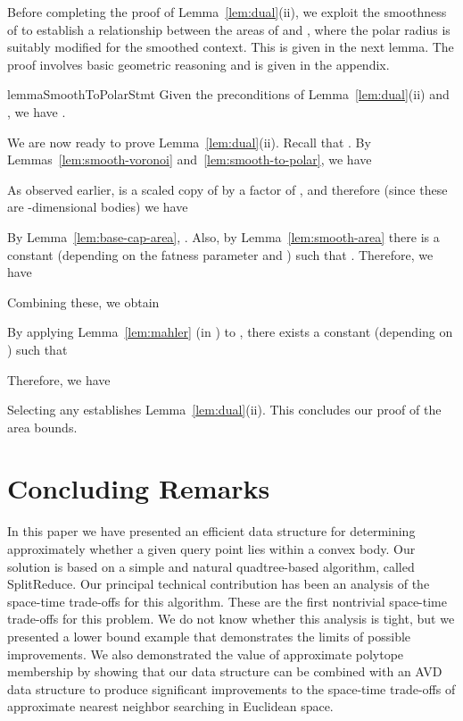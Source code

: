 \documentclass[11pt]{article}   \usepackage[letterpaper,hmargin=2.1cm,vmargin=3cm]{geometry}
\newcommand{\alg}{\textrm{SplitReduce}}
\begin{document}
Before completing the proof of Lemma~\ref{lem:dual}(ii), we exploit the smoothness of  to establish a relationship between the areas of  and , where the polar radius  is suitably modified for the smoothed context. This is given in the next lemma. The proof involves basic geometric reasoning and is given in the appendix.

\begin{restatable}{lemma}{SmoothToPolarStmt}\label{lem:smooth-to-polar}
Given the preconditions of Lemma~\ref{lem:dual}(ii) and , we have .
\end{restatable}


\bigskip

We are now ready to prove Lemma~\ref{lem:dual}(ii). Recall that . By Lemmas~\ref{lem:smooth-voronoi} and~\ref{lem:smooth-to-polar}, we have

As observed earlier,  is a scaled copy of  by a factor of , and therefore (since these are -dimensional bodies) we have

By Lemma~\ref{lem:base-cap-area}, . Also, by Lemma~\ref{lem:smooth-area} there is a constant  (depending on the fatness parameter  and ) such that . Therefore, we have

Combining these, we obtain

By applying Lemma~\ref{lem:mahler} (in ) to , there exists a constant  (depending on ) such that

Therefore, we have

Selecting any  establishes Lemma~\ref{lem:dual}(ii). This concludes our proof of the area bounds. 

\section{Concluding Remarks}


In this paper we have presented an efficient data structure for determining approximately whether a given query point lies within a convex body. Our solution is based on a simple and natural quadtree-based algorithm, called {\alg}. Our principal technical contribution has been an analysis of the space-time trade-offs for this algorithm. These are the first nontrivial space-time trade-offs for this problem. We do not know whether this analysis is tight, but we presented a lower bound example that demonstrates the limits of possible improvements. We also demonstrated the value of approximate polytope membership by showing that our data structure can be combined with an AVD data structure to produce significant improvements to the space-time trade-offs of approximate nearest neighbor searching in Euclidean space.
\end{document}
